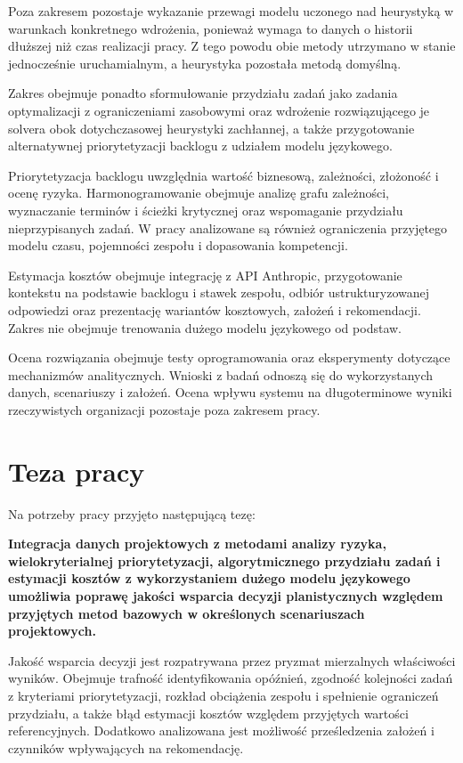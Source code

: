 Poza zakresem pozostaje wykazanie przewagi modelu uczonego nad heurystyką w warunkach konkretnego wdrożenia, ponieważ wymaga to danych o historii dłuższej niż czas realizacji pracy. Z tego powodu obie metody utrzymano w stanie jednocześnie uruchamialnym, a heurystyka pozostała metodą domyślną.

Zakres obejmuje ponadto sformułowanie przydziału zadań jako zadania optymalizacji z ograniczeniami zasobowymi oraz wdrożenie rozwiązującego je solvera obok dotychczasowej heurystyki zachłannej, a także przygotowanie alternatywnej priorytetyzacji backlogu z udziałem modelu językowego.

Priorytetyzacja backlogu uwzględnia wartość biznesową, zależności, złożoność i ocenę ryzyka. Harmonogramowanie obejmuje analizę grafu zależności, wyznaczanie terminów i ścieżki krytycznej oraz wspomaganie przydziału nieprzypisanych zadań. W pracy analizowane są również ograniczenia przyjętego modelu czasu, pojemności zespołu i dopasowania kompetencji.

Estymacja kosztów obejmuje integrację z API Anthropic, przygotowanie kontekstu na podstawie backlogu i stawek zespołu, odbiór ustrukturyzowanej odpowiedzi oraz prezentację wariantów kosztowych, założeń i rekomendacji. Zakres nie obejmuje trenowania dużego modelu językowego od podstaw.

Ocena rozwiązania obejmuje testy oprogramowania oraz eksperymenty dotyczące mechanizmów analitycznych. Wnioski z badań odnoszą się do wykorzystanych danych, scenariuszy i założeń. Ocena wpływu systemu na długoterminowe wyniki rzeczywistych organizacji pozostaje poza zakresem pracy.

\section{Teza pracy}

Na potrzeby pracy przyjęto następującą tezę:

\textbf{Integracja danych projektowych z metodami analizy ryzyka, wielokryterialnej priorytetyzacji, algorytmicznego przydziału zadań i estymacji kosztów z wykorzystaniem dużego modelu językowego umożliwia poprawę jakości wsparcia decyzji planistycznych względem przyjętych metod bazowych w określonych scenariuszach projektowych.}

Jakość wsparcia decyzji jest rozpatrywana przez pryzmat mierzalnych właściwości wyników. Obejmuje trafność identyfikowania opóźnień, zgodność kolejności zadań z kryteriami priorytetyzacji, rozkład obciążenia zespołu i spełnienie ograniczeń przydziału, a także błąd estymacji kosztów względem przyjętych wartości referencyjnych. Dodatkowo analizowana jest możliwość prześledzenia założeń i czynników wpływających na rekomendację.

